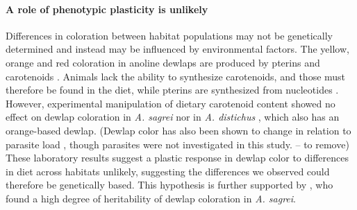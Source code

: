 \paragraph{A role of phenotypic plasticity is unlikely} Differences in coloration between habitat populations may not be genetically determined and instead may be influenced by environmental factors. The yellow, orange and red coloration in anoline dewlaps are produced by pterins and carotenoids \citep{Ortiz1962, Ortiz1962a, Ortiz1963, Ortiz1966, Macedonia2000, Steffen2007, Steffen2009}. Animals lack the ability to synthesize carotenoids, and those must therefore be found in the diet, while pterins are synthesized from nucleotides \citep{Goodwin1984, Hill2002, Hill2006}. However, experimental manipulation of dietary carotenoid content showed no effect on dewlap coloration in \textit{A. sagrei} \citep{Steffen2010} nor in \textit{A. distichus} \citep{Ng2013}, which also has an orange-based dewlap. (Dewlap color has also been shown to change in relation to parasite load \citep{Cook2013}, though parasites were not investigated in this study. -- to remove) These laboratory results  suggest a plastic response in dewlap color to differences in diet across habitats unlikely, suggesting the differences we observed could therefore be genetically based. This hypothesis is further supported by \citet{Cox2017}, who found a high degree of heritability of dewlap coloration in \textit{A. sagrei}.

